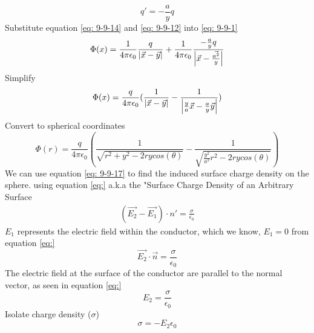 \documentclass[12pt]{article}
\begin{document}
    \begin{equation} \label{eq: 9-9-14}
        q' = -\frac{a}{y} q
    \end{equation}
    Substitute equation \ref{eq: 9-9-14} and \ref{eq: 9-9-12} into \ref{eq: 9-9-1}
    \begin{equation} \label{9-9-15}
        \Phi(x) = \frac{1}{4 \pi \epsilon_0} \frac{q}{\abs{\vec{x}-\vec{y}}} + \frac{1}{4 \pi \epsilon_0} \frac{-\frac{a}{y} q}{\abs{\vec{x} - \vec{\frac{a^2}{y}}}}
    \end{equation}
    Simplify
    \begin{equation} \label{eq: 9-9-16}
        \Phi(x) = \frac{q}{4 \pi \epsilon_0} (\frac{1}{\abs{\vec{x}-\vec{y}}} - \frac{1}{\abs{\frac{y}{a} \vec{x} - \frac{a}{y} \vec{y}}})
    \end{equation}
    Convert to spherical coordinates
    \begin{equation} \label{eq: 9-9-17}
        \Phi(r) = \frac{q}{4 \pi \epsilon_0} (\frac{1}{\sqrt{r^2 + y^2 - 2 r y cos(\theta)}} - \frac{1}{\sqrt{\frac{y^2}{a^2} r^2 - 2 r y cos(\theta)}})
    \end{equation}
    \newline We can use equation \ref{eq: 9-9-17} to find the induced surface charge density on the sphere.
    \newline using equation \ref{eq:} a.k.a the "Surface Charge Density of an Arbitrary Surface
    \begin{gather*}
        (\vec{E_2} - \vec{E_1}) \cdot n' = \frac{\sigma}{\epsilon_0}
    \end{gather*}
    $E_1$ represents the electric field within the conductor, which we know, $E_1=0$ from equation \ref{eq:}
    \begin{equation} \label{eq: 9-9-18}
        \vec{E_2} \cdot \vec{n} = \frac{\sigma}{\epsilon_0}
    \end{equation}
    The electric field at the surface of the conductor are parallel to the normal vector, as seen in equation \ref{eq:}
    \begin{equation} \label{eq: 9-9-19}
        E_2 = \frac{\sigma}{\epsilon_0}
    \end{equation}
    Isolate charge density ($\sigma$)
    \begin{equation} \label{eq: 9-9-20}
        \sigma = -E_2 \epsilon_0
    \end{equation}
\end{document}
